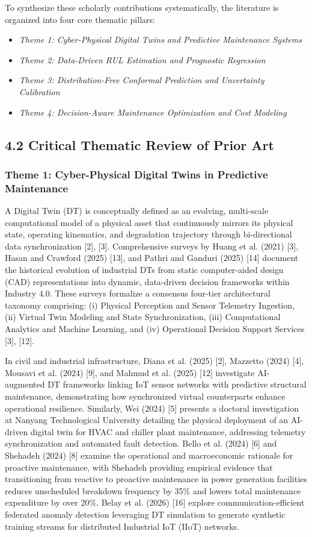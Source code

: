 \documentclass[12pt,a4paper]{article}
\begin{document}
To synthesize these scholarly contributions systematically, the literature is organized into four core thematic pillars:
\begin{itemize}
    \item \textit{Theme 1: Cyber-Physical Digital Twins and Predictive Maintenance Systems}
    \item \textit{Theme 2: Data-Driven RUL Estimation and Prognostic Regression}
    \item \textit{Theme 3: Distribution-Free Conformal Prediction and Uncertainty Calibration}
    \item \textit{Theme 4: Decision-Aware Maintenance Optimization and Cost Modeling}
\end{itemize}

\subsection*{4.2 Critical Thematic Review of Prior Art}

\subsubsection*{Theme 1: Cyber-Physical Digital Twins in Predictive Maintenance}
A Digital Twin (DT) is conceptually defined as an evolving, multi-scale computational model of a physical asset that continuously mirrors its physical state, operating kinematics, and degradation trajectory through bi-directional data synchronization [2], [3]. Comprehensive surveys by Huang et al. (2021) [3], Hasan and Crawford (2025) [13], and Pathri and Ganduri (2025) [14] document the historical evolution of industrial DTs from static computer-aided design (CAD) representations into dynamic, data-driven decision frameworks within Industry 4.0. These surveys formalize a consensus four-tier architectural taxonomy comprising: (i) Physical Perception and Sensor Telemetry Ingestion, (ii) Virtual Twin Modeling and State Synchronization, (iii) Computational Analytics and Machine Learning, and (iv) Operational Decision Support Services [3], [12].

In civil and industrial infrastructure, Diana et al. (2025) [2], Mazzetto (2024) [4], Mousavi et al. (2024) [9], and Mahmud et al. (2025) [12] investigate AI-augmented DT frameworks linking IoT sensor networks with predictive structural maintenance, demonstrating how synchronized virtual counterparts enhance operational resilience. Similarly, Wei (2024) [5] presents a doctoral investigation at Nanyang Technological University detailing the physical deployment of an AI-driven digital twin for HVAC and chiller plant maintenance, addressing telemetry synchronization and automated fault detection. Bello et al. (2024) [6] and Shehadeh (2024) [8] examine the operational and macroeconomic rationale for proactive maintenance, with Shehadeh providing empirical evidence that transitioning from reactive to proactive maintenance in power generation facilities reduces unscheduled breakdown frequency by 35\% and lowers total maintenance expenditure by over 20\%. Belay et al. (2026) [16] explore communication-efficient federated anomaly detection leveraging DT simulation to generate synthetic training streams for distributed Industrial IoT (IIoT) networks.
\end{document}
